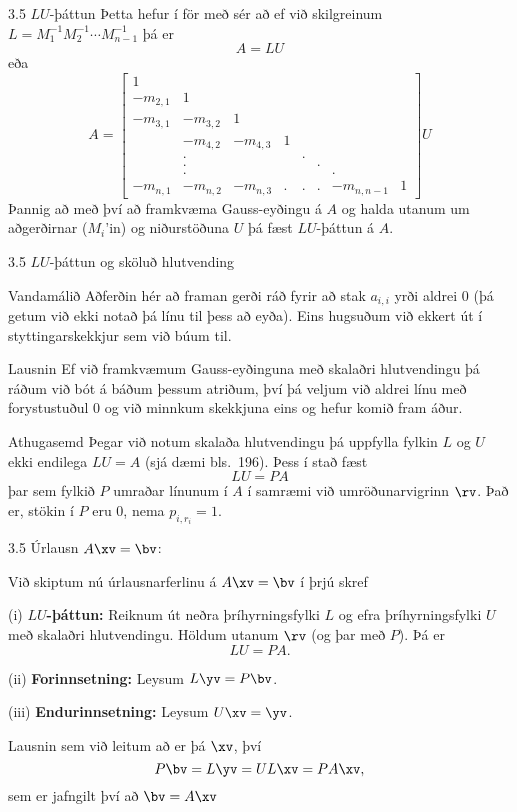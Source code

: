 \begin{frame}{3.5 $LU$-þáttun}
 Þetta hefur í för með sér að ef við skilgreinum 
$L = M_1^{-1} M_2^{-1} \cdots M_{n-1}^{-1}$ \pause þá er
$$
A = LU
$$\pause
eða
$$
A = \left[\begin{array}{cccccccc}
1 &   &   &   &   &   &   &  \\
-m_{2,1} & 1 &   &   &   &   &   &  \\
-m_{3,1} & -m_{3,2} & 1 &   &   &   &   &  \\
  & -m_{4,2} & -m_{4,3} & 1 &   &   &   &  \\
  & . &   &   & . &   &   &  \\
  & . &   &   &   & . &   &  \\
  & . &   &   &   &   & . &  \\
-m_{n,1} & -m_{n,2} & -m_{n,3} & . & . & . & -m_{n,n-1} & 1
   \end{array}\right] U
$$
Þannig að með því að framkvæma Gauss-eyðingu á $A$ og halda utanum um aðgerðirnar ($M_i$'in)
og niðurstöðuna $U$ þá fæst $LU$-þáttun á $A$.
\end{frame}

\begin{frame}{3.5 $LU$-þáttun og sköluð hlutvending}
\begin{block}{Vandamálið}
  Aðferðin hér að framan gerði ráð fyrir að stak $a_{i,i}$ yrði aldrei 0 (þá
getum við ekki notað þá línu til þess að eyða). Eins hugsuðum við ekkert út í styttingarskekkjur
sem við búum til. 
\end{block}

\begin{block}{Lausnin} 
 Ef við framkvæmum Gauss-eyðinguna með skalaðri hlutvendingu þá ráðum við bót á báðum þessum
atriðum, því þá veljum við aldrei línu með forystustuðul 0 og við minnkum skekkjuna eins og hefur
komið fram áður.
\end{block}

\begin{block}{Athugasemd}
 Þegar við notum skalaða hlutvendingu þá uppfylla fylkin $L$ og $U$ ekki endilega $LU=A$ 
(sjá dæmi bls.~196). \pause Þess í stað fæst 
  $$LU =PA$$
þar sem fylkið $P$ umraðar línunum í $A$ í samræmi við umröðunarvigrinn $\rv$. \pause
Það er, stökin í $P$ eru 0, nema $p_{i,r_i} = 1$.
\end{block}
\end{frame}


\begin{frame}{3.5 Úrlausn $A\xv=\bv$:} 

Við skiptum nú úrlausnarferlinu á $A\xv=\bv$ í þrjú skref

(i) {\bf $LU$-þáttun:}  Reiknum út neðra þríhyrningsfylki $L$  og efra þríhyrningsfylki $U$ með 
skalaðri hlutvendingu. Höldum utanum $\rv$ (og þar með $P$). Þá er 
$$
LU=PA.
$$\pause

(ii) {\bf Forinnsetning:}  Leysum $L\yv=P\bv$.

(iii) {\bf Endurinnsetning:} Leysum $U\xv=\yv$.

Lausnin sem við leitum að er þá $\xv$, því
$$
P\bv = L\yv = UL\xv = PA\xv,
$$
sem er jafngilt því að $\bv=A\xv$
\end{frame}


